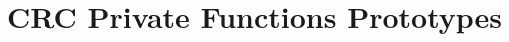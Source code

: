 \hypertarget{group___c_r_c___private___functions___prototypes}{}\section{C\+RC Private Functions Prototypes}
\label{group___c_r_c___private___functions___prototypes}
